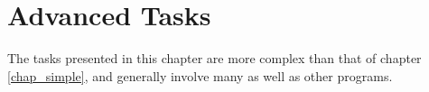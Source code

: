 \chapter{Advanced Tasks}
\label{chap_adv}

The tasks presented in this chapter are more complex than that of chapter
\ref{chap_simple}, and generally involve many \nutils{} as well as other
programs.







